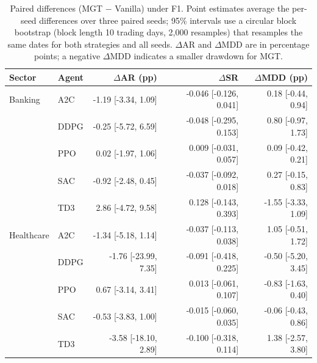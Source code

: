 \begin{table}[!t]\centering\small\color{blue}
\caption{Paired differences (MGT $-$ Vanilla) under F1. Point estimates average the per-seed differences over three paired seeds; 95\% intervals use a circular block bootstrap (block length 10 trading days, 2{,}000 resamples) that resamples the same dates for both strategies and all seeds. $\Delta$AR and $\Delta$MDD are in percentage points; a negative $\Delta$MDD indicates a smaller drawdown for MGT.}
\label{tab:paired_boot}
\begin{tabular}{llrrr}\toprule
Sector & Agent & $\Delta$AR (pp) & $\Delta$SR & $\Delta$MDD (pp) \\ \midrule
Banking & A2C & -1.19 [-3.34, 1.09] & -0.046 [-0.126, 0.041] & 0.18 [-0.44, 0.94] \\
 & DDPG & -0.25 [-5.72, 6.59] & -0.048 [-0.295, 0.153] & 0.80 [-0.97, 1.73] \\
 & PPO & 0.02 [-1.97, 1.06] & 0.009 [-0.031, 0.057] & 0.09 [-0.42, 0.21] \\
 & SAC & -0.92 [-2.48, 0.45] & -0.037 [-0.092, 0.018] & 0.27 [-0.15, 0.83] \\
 & TD3 & 2.86 [-4.72, 9.58] & 0.128 [-0.143, 0.393] & -1.55 [-3.33, 1.09] \\
\midrule
Healthcare & A2C & -1.34 [-5.18, 1.14] & -0.037 [-0.113, 0.038] & 1.05 [-0.51, 1.72] \\
 & DDPG & -1.76 [-23.99, 7.35] & -0.091 [-0.418, 0.225] & -0.50 [-5.20, 3.45] \\
 & PPO & 0.67 [-3.14, 3.41] & 0.013 [-0.061, 0.107] & -0.83 [-1.63, 0.40] \\
 & SAC & -0.53 [-3.83, 1.00] & -0.015 [-0.060, 0.035] & -0.06 [-0.43, 0.86] \\
 & TD3 & -3.58 [-18.10, 2.89] & -0.100 [-0.318, 0.114] & 1.38 [-2.57, 3.80] \\
\bottomrule
\end{tabular}\end{table}